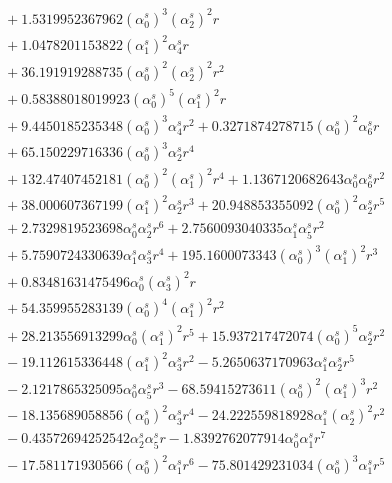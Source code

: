 \documentclass[10pt]{article}
\begin{document}
\begin{align*}
&{}  + 1.5319952367962 \left(\alpha_{0}^s\right)^{3} \left(\alpha_{2}^s\right)^{2} r \\
&{}  + 1.0478201153822 \left(\alpha_{1}^s\right)^{2} \alpha_{4}^s r \\
&{}  + 36.191919288735 \left(\alpha_{0}^s\right)^{2} \left(\alpha_{2}^s\right)^{2} r^{2} \\
&{}  + 0.58388018019923 \left(\alpha_{0}^s\right)^{5} \left(\alpha_{1}^s\right)^{2} r \\
&{}  + 9.4450185235348 \left(\alpha_{0}^s\right)^{3} \alpha_{4}^s r^{2} + 0.3271874278715 \left(\alpha_{0}^s\right)^{2} \alpha_{6}^s r \\
&{}  + 65.150229716336 \left(\alpha_{0}^s\right)^{3} \alpha_{2}^s r^{4} \\
&{}  + 132.47407452181 \left(\alpha_{0}^s\right)^{2} \left(\alpha_{1}^s\right)^{2} r^{4} + 1.1367120682643 \alpha_{0}^s \alpha_{6}^s r^{2} \\
&{}  + 38.000607367199 \left(\alpha_{1}^s\right)^{2} \alpha_{2}^s r^{3} + 20.948853355092 \left(\alpha_{0}^s\right)^{2} \alpha_{2}^s r^{5} \\
&{}  + 2.7329819523698 \alpha_{0}^s \alpha_{2}^s r^{6} + 2.7560093040335 \alpha_{1}^s \alpha_{5}^s r^{2} \\
&{}  + 5.7590724330639 \alpha_{1}^s \alpha_{3}^s r^{4} + 195.1600073343 \left(\alpha_{0}^s\right)^{3} \left(\alpha_{1}^s\right)^{2} r^{3} \\
&{}  + 0.83481631475496 \alpha_{0}^s \left(\alpha_{3}^s\right)^{2} r \\
&{}  + 54.359955283139 \left(\alpha_{0}^s\right)^{4} \left(\alpha_{1}^s\right)^{2} r^{2} \\
&{}  + 28.213556913299 \alpha_{0}^s \left(\alpha_{1}^s\right)^{2} r^{5} + 15.937217472074 \left(\alpha_{0}^s\right)^{5} \alpha_{2}^s r^{2} \\
&{}  - 19.112615336448 \left(\alpha_{1}^s\right)^{2} \alpha_{3}^s r^{2} - 5.2650637170963 \alpha_{1}^s \alpha_{2}^s r^{5} \\
&{}  - 2.1217865325095 \alpha_{0}^s \alpha_{5}^s r^{3} - 68.59415273611 \left(\alpha_{0}^s\right)^{2} \left(\alpha_{1}^s\right)^{3} r^{2} \\
&{}  - 18.135689058856 \left(\alpha_{0}^s\right)^{2} \alpha_{3}^s r^{4} - 24.222559818928 \alpha_{1}^s \left(\alpha_{2}^s\right)^{2} r^{2} \\
&{}  - 0.43572694252542 \alpha_{2}^s \alpha_{5}^s r - 1.8392762077914 \alpha_{0}^s \alpha_{1}^s r^{7} \\
&{}  - 17.581171930566 \left(\alpha_{0}^s\right)^{2} \alpha_{1}^s r^{6} - 75.801429231034 \left(\alpha_{0}^s\right)^{3} \alpha_{1}^s r^{5} \\

\end{align*}
\end{document}
